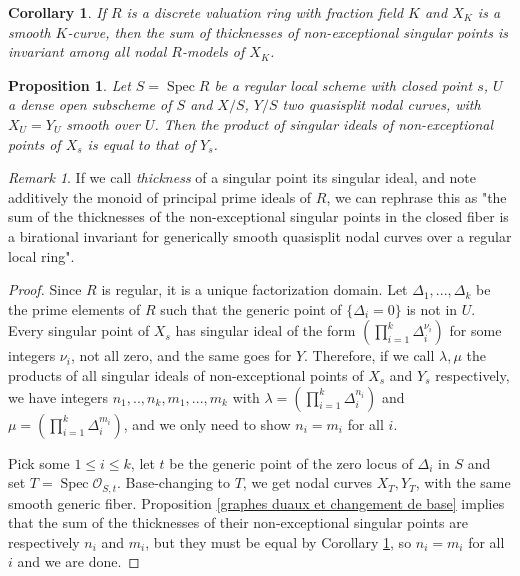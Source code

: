 \documentclass[a4paper,12pt]{amsart} %
\numberwithin{equation}{subsection}
\newcommand{\Spec}{\operatorname{Spec}}
\theoremstyle{definition}
\theoremstyle{plain}%
\newtheorem{proposition}[definition]{Proposition}
\newtheorem{corollary}[definition]{Corollary}
\theoremstyle{remark}
\newtheorem{remark}[definition]{Remark}
\renewcommand{\O}{\mathcal{O}}
\begin{document}
\begin{corollary}\label{corollary invariance of the sum of thicknesses of non exceptional points over a dvr}
If $R$ is a discrete valuation ring with fraction field $K$ and $X_K$ is a smooth $K$-curve, then the sum of thicknesses of non-exceptional singular points is invariant among all nodal $R$-models of $X_K$.
\end{corollary}

\begin{proposition}\label{prop invariance of the sum of thicknesses of non exceptional points}
Let $S=\Spec R$ be a regular local scheme with closed point $s$, $U$ a dense open subscheme of $S$ and $X/S$, $Y/S$ two quasisplit nodal curves, with $X_U=Y_U$ smooth over $U$. Then the product of singular ideals of non-exceptional points of $X_s$ is equal to that of $Y_s$.
\end{proposition}

\begin{remark}\label{locrem1}
If we call \emph{thickness} of a singular point its singular ideal, and note additively the monoid of principal prime ideals of $R$, we can rephrase this as "the sum of the thicknesses of the non-exceptional singular points in the closed fiber is a birational invariant for generically smooth quasisplit nodal curves over a regular local ring".
\end{remark}

\begin{proof}
Since $R$ is regular, it is a unique factorization domain. Let $\Delta_1,...,\Delta_k$ be the prime elements of $R$ such that the generic point of $\{\Delta_i=0\}$ is not in $U$. Every singular point of $X_s$ has singular ideal of the form $\left(\prod\limits_{i=1}^k \Delta_i^{\nu_i}\right)$ for some integers $\nu_i$, not all zero, and the same goes for $Y$. Therefore, if we call $\lambda,\mu$ the products of all singular ideals of non-exceptional points of $X_s$ and $Y_s$ respectively, we have integers $n_1,..,n_k,m_1,...,m_k$ with $\lambda=\left(\prod\limits_{i=1}^k \Delta_i^{n_i}\right)$ and $\mu=\left(\prod\limits_{i=1}^k \Delta_i^{m_i}\right)$, and we only need to show $n_i=m_i$ for all $i$.

Pick some $1\leq i\leq k$, let $t$ be the generic point of the zero locus of $\Delta_i$ in $S$ and set $T=\Spec\O_{S,t}$. Base-changing to $T$, we get nodal curves $X_T,Y_T$, with the same smooth generic fiber. Proposition \ref{graphes duaux et changement de base} implies that the sum of the thicknesses of their non-exceptional singular points are respectively $n_i$ and $m_i$, but they must be equal by Corollary \ref{corollary invariance of the sum of thicknesses of non exceptional points over a dvr}, so $n_i=m_i$ for all $i$ and we are done.
\end{proof}
\end{document}
